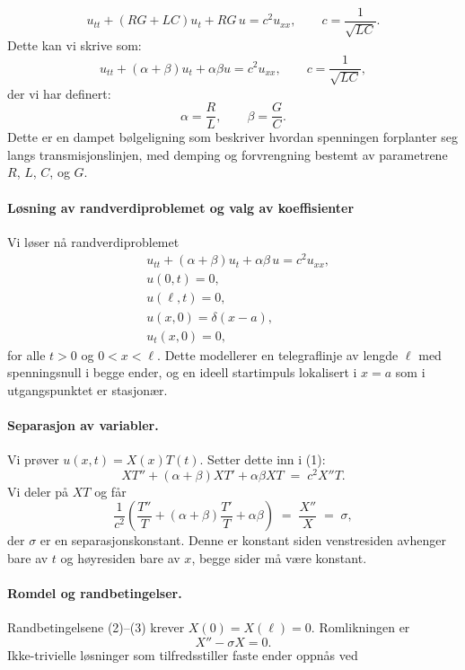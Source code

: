 \begin{equation}
    u_{tt} + (RG + LC)u_t + RG\,u = c^2 u_{xx}, \qquad c = \frac{1}{\sqrt{LC}} .
\end{equation}
Dette kan vi skrive som:
\begin{equation}
    u_{tt} + (\alpha + \beta)u_t + \alpha \beta u = c^2 u_{xx}, \qquad c = \frac{1}{\sqrt{LC}} ,
\end{equation}
der vi har definert:
\begin{equation}
    \alpha = \frac{R}{L}, \qquad \beta = \frac{G}{C} .
\end{equation}
Dette er en dampet bølgeligning som beskriver hvordan spenningen forplanter seg langs transmisjonslinjen, med demping og forvrengning bestemt av parametrene $R$, $L$, $C$, og $G$.



\paragraph{Løsning av randverdiproblemet og valg av koeffisienter}

Vi løser nå randverdiproblemet
\begin{align}
  &u_{tt}+(\alpha+\beta)u_t+\alpha\beta\,u = c^2 u_{xx}, \tag{1}\\
  &u(0,t)=0, \tag{2}\\
  &u(\ell,t)=0, \tag{3}\\
  &u(x,0)=\delta(x-a), \tag{4}\\
  &u_t(x,0)=0, \tag{5}
\end{align}
for alle $t>0$ og $0<x<\ell$. Dette modellerer en telegraflinje av lengde $\ell$ med spenningsnull i begge ender, og en ideell startimpuls lokalisert i $x=a$ som i utgangspunktet er stasjonær.

\paragraph{Separasjon av variabler.}
Vi prøver $u(x,t)=X(x)T(t)$. Setter dette inn i (1):
\[
XT'' + (\alpha+\beta)XT' + \alpha\beta XT
\;=\; c^2 X''T.
\]
Vi deler på $XT$ og får
\[
\frac{1}{c^2}\!\left(\frac{T''}{T} + (\alpha+\beta)\frac{T'}{T} + \alpha\beta\right) \;=\; \frac{X''}{X} \;=\; \sigma,
\]
der $\sigma$ er en separasjonskonstant. Denne er konstant siden venstresiden avhenger bare av $t$ og høyresiden bare av $x$, begge sider må være konstant.

\paragraph{Romdel og randbetingelser.}
Randbetingelsene (2)--(3) krever $X(0)=X(\ell)=0$. Romlikningen er
\[
X'' - \sigma X = 0.
\]
Ikke-trivielle løsninger som tilfredsstiller faste ender oppnås ved

